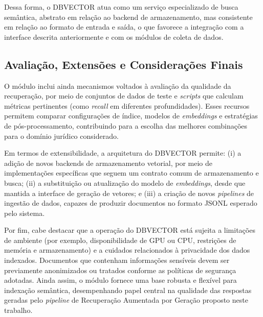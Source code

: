 Dessa forma, o DBVECTOR atua como um serviço especializado de busca semântica, abstrato em relação ao backend de armazenamento, mas consistente em relação ao formato de entrada e saída, o que favorece a integração com a interface descrita anteriormente e com os módulos de coleta de dados.

\subsection{Avaliação, Extensões e Considerações Finais}
O módulo inclui ainda mecanismos voltados à avaliação da qualidade da recuperação, por meio de conjuntos de dados de teste e \textit{scripts} que calculam métricas pertinentes (como \textit{recall} em diferentes profundidades). Esses recursos permitem comparar configurações de índice, modelos de \textit{embeddings} e estratégias de pós-processamento, contribuindo para a escolha das melhores combinações para o domínio jurídico considerado.

Em termos de extensibilidade, a arquitetura do DBVECTOR permite: (i) a adição de novos backends de armazenamento vetorial, por meio de implementações específicas que seguem um contrato comum de armazenamento e busca; (ii) a substituição ou atualização do modelo de \textit{embeddings}, desde que mantida a interface de geração de vetores; e (iii) a criação de novos \textit{pipelines} de ingestão de dados, capazes de produzir documentos no formato JSONL esperado pelo sistema.

Por fim, cabe destacar que a operação do DBVECTOR está sujeita a limitações de ambiente (por exemplo, disponibilidade de GPU ou CPU, restrições de memória e armazenamento) e a cuidados relacionados à privacidade dos dados indexados. Documentos que contenham informações sensíveis devem ser previamente anonimizados ou tratados conforme as políticas de segurança adotadas. Ainda assim, o módulo fornece uma base robusta e flexível para indexação semântica, desempenhando papel central na qualidade das respostas geradas pelo \textit{pipeline} de Recuperação Aumentada por Geração proposto neste trabalho.
